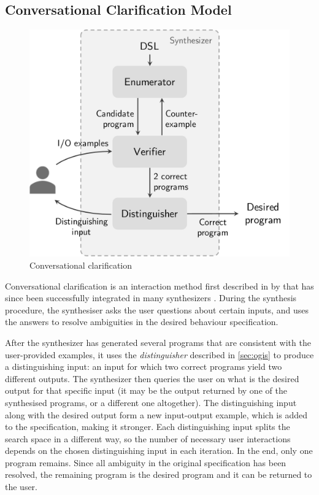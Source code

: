 \subsection{Conversational Clarification Model}\label{sec:rel-conv-clarification}
\begin{figure}
    \centering
    \includegraphics[scale=.35]{pictures/conversational_clarification.pdf}
    \caption{Conversational clarification}
    \label{fig:conversational_clarification}
\end{figure}

Conversational clarification is an interaction method first described in \citeyear{DBLP:conf/uist/MayerSGLMPSZG15} by \citet{DBLP:conf/uist/MayerSGLMPSZG15} that has since been successfully integrated in many synthesizers  \cite{DBLP:journals/pvldb/LiCM15,DBLP:journals/corr/abs-1909-11206,DBLP:conf/sigmod/WangCB17,DBLP:conf/pldi/WangCB17}.
During the synthesis procedure, the synthesiser asks the user questions about certain inputs, and uses the answers to resolve ambiguities in the desired behaviour specification. 

After the synthesizer has generated several programs that are consistent with the user-provided examples, it uses the \textit{distinguisher} described in \autoref{sec:ogis} to produce a distinguishing input:
an input for which two correct programs yield two different outputs.
The synthesizer then queries the user on what is the desired output for that specific input (it may be the output returned by one of the synthesised programs, or a different one altogether).
The distinguishing input along with the desired output form a new input-output example, which is added to the specification, making it stronger.
Each distinguishing input splits the search space in a different way, so the number of necessary user interactions depends on the chosen distinguishing input in each iteration.
In the end, only one program remains. Since all ambiguity in the original specification has been resolved, the remaining program is the desired program and it can be returned to the user.


